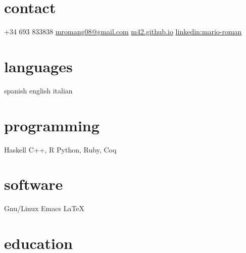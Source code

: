 \documentclass[]{friggeri-cv-a4}
\begin{document}

\begin{aside} %
\section{contact}
+34 693 833838
\href{mailto:mromang08@gmail.com}{mromang08@gmail.com}
\href{https://m42.github.io}{m42.github.io}
\href{https://www.linkedin.com/in/mario-roman}{linkedin:mario-roman}
\section{languages}
spanish
english
italian
\section{programming}
Haskell
C++, R
Python, Ruby, Coq
\section{software}
Gnu/Linux
Emacs
LaTeX
\end{aside}



\section{education}
\end{document}
